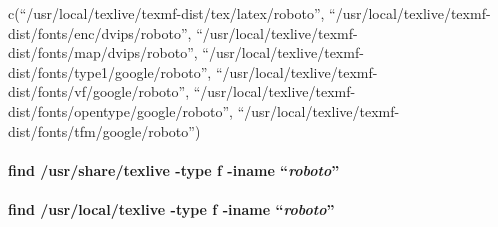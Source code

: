 \documentclass[
]{article}
\newenvironment{Shaded}{\begin{snugshade}}{\end{snugshade}}
\newcommand{\AttributeTok}[1]{\textcolor[rgb]{0.13,0.29,0.53}{#1}}
\newcommand{\ConstantTok}[1]{\textcolor[rgb]{0.56,0.35,0.01}{#1}}
\newcommand{\ControlFlowTok}[1]{\textcolor[rgb]{0.13,0.29,0.53}{\textbf{#1}}}
\newcommand{\DecValTok}[1]{\textcolor[rgb]{0.00,0.00,0.81}{#1}}
\newcommand{\FunctionTok}[1]{\textcolor[rgb]{0.13,0.29,0.53}{\textbf{#1}}}
\newcommand{\NormalTok}[1]{#1}
\newcommand{\SpecialCharTok}[1]{\textcolor[rgb]{0.81,0.36,0.00}{\textbf{#1}}}
\newcommand{\StringTok}[1]{\textcolor[rgb]{0.31,0.60,0.02}{#1}}
\begin{document}
\begin{Shaded}
\end{Shaded}

c(``/usr/local/texlive/texmf-dist/tex/latex/roboto'',
``/usr/local/texlive/texmf-dist/fonts/enc/dvips/roboto'',
``/usr/local/texlive/texmf-dist/fonts/map/dvips/roboto'',
``/usr/local/texlive/texmf-dist/fonts/type1/google/roboto'',
``/usr/local/texlive/texmf-dist/fonts/vf/google/roboto'',
``/usr/local/texlive/texmf-dist/fonts/opentype/google/roboto'',
``/usr/local/texlive/texmf-dist/fonts/tfm/google/roboto'')

\hypertarget{find-usrsharetexlive--type-f--iname-roboto}{%
\paragraph{\texorpdfstring{find /usr/share/texlive -type f -iname
``\emph{roboto}''}{find /usr/share/texlive -type f -iname ``roboto''}}\label{find-usrsharetexlive--type-f--iname-roboto}}

\hypertarget{find-usrlocaltexlive--type-f--iname-roboto}{%
\paragraph{\texorpdfstring{find /usr/local/texlive -type f -iname
``\emph{roboto}''}{find /usr/local/texlive -type f -iname ``roboto''}}\label{find-usrlocaltexlive--type-f--iname-roboto}}
\end{document}
